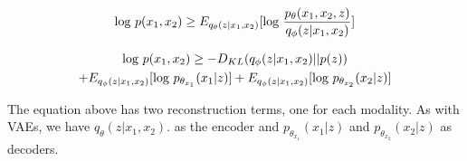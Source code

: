 \documentclass{article}
\begin{document}
\begin{equation}
\textup{log }p(x_{1}, x_{2}) \geq E_{q_{\theta}(z | x_{1}, x_{2})}[\textup{log }\frac{p_{\theta}(x_{1}, x_{2}, z)}{q_{\phi}(z | x_{1}, x_{2})}]
\end{equation}

\begin{multline}
\textup{log }p(x_{1}, x_{2}) \geq -D_{KL}(q_{\phi}(z | x_{1}, x_{2}) || p(z)) \\ + E_{q_{\phi}(z | x_{1}, x_{2})}[\textup{log } p_{\theta_{x_{1}}}(x_{1} | z)] + E_{q_{\phi}(z | x_{1}, x_{2})}[\textup{log } p_{\theta_{x_{2}}}(x_{2} | z)]
\end{multline}

The equation above has two reconstruction terms, one for each modality. As with VAEs, we have $q_{\theta}(z | x_{1}, x_{2})$. as the encoder and $p_{\theta_{x_{1}}}(x_{1} | z)$ and $p_{\theta_{x_{2}}}(x_{2} | z)$ as decoders.
\end{document}
